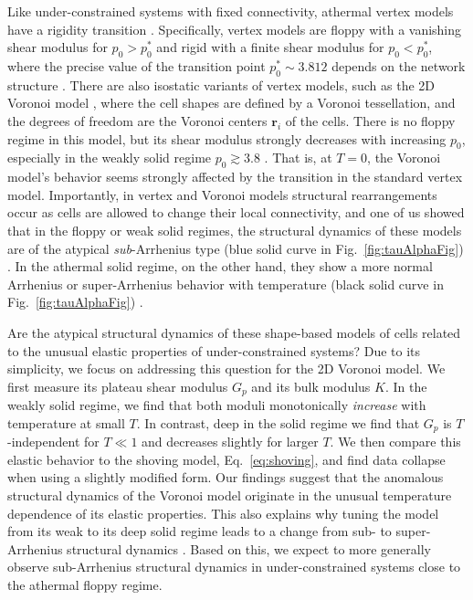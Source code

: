 \documentclass[aps,reprint,superscriptaddress,nofootinbib, notitlepage,prl]{revtex4-2}
\begin{document}
Like under-constrained systems with fixed connectivity, athermal vertex models have a rigidity transition \cite{farhadifar2007influence,bi2015density,merkel2018geometrically,Merkel2019,duclut2021nonlinear,tong2022linear}. Specifically, vertex models are floppy with a vanishing shear modulus for $p_0>p_0^\ast$ and rigid with a finite shear modulus for $p_0<p_0^\ast$, where the precise value of the transition point $p_0^\ast\sim 3.812$ depends on the network structure \cite{Wang2020}.
There are also isostatic variants of vertex models, such as the 2D Voronoi model \cite{bi2016motility,sussman2018no,Pinto2022}, where the cell shapes are defined by a Voronoi tessellation, and the degrees of freedom are the Voronoi centers $\bm{r}_i$ of the cells.
There is no floppy regime in this model, but its shear modulus strongly decreases with increasing $p_0$, especially in the weakly solid regime $p_0\gtrsim 3.8$ \cite{sussman2018no}.
That is, at $T=0$, the Voronoi model's behavior seems strongly affected by the transition in the standard vertex model.
Importantly, in vertex and Voronoi models structural rearrangements occur as cells are allowed to change their local connectivity, and one of us showed that in the floppy or weak solid regimes, the structural dynamics of these models are of the atypical \emph{sub}-Arrhenius type (blue solid curve in Fig.~\ref{fig:tauAlphaFig}) \cite{sussman2018anomalous}.
In the athermal solid regime, on the other hand, they show a more normal Arrhenius or super-Arrhenius behavior with temperature (black solid curve in Fig.~\ref{fig:tauAlphaFig}) \cite{li2021softness,Pandey2024}.

Are the atypical structural dynamics of these shape-based models of cells related to the unusual elastic properties of under-constrained systems?
Due to its simplicity, we focus on addressing this question for the 2D Voronoi model.
We first measure its plateau shear modulus $G_p$ and its bulk modulus $K$. In the weakly solid regime, we find that both moduli monotonically \emph{increase} with temperature at small $T$.
In contrast, deep in the solid regime we find that $G_p$ is $T$-independent for $T\ll 1$ and decreases slightly for larger $T$.
We then compare this elastic behavior to the shoving model, Eq.~\eqref{eq:shoving}, and find data collapse when using a slightly modified form.
Our findings suggest that the anomalous structural dynamics of the Voronoi model originate in the unusual temperature dependence of its elastic properties.
This also explains why tuning the model from its weak to its deep solid regime leads to a change from sub- to super-Arrhenius structural dynamics \cite{li2021softness}.
Based on this, we expect to more generally observe sub-Arrhenius structural dynamics in under-constrained systems close to the athermal floppy regime.
\end{document}
